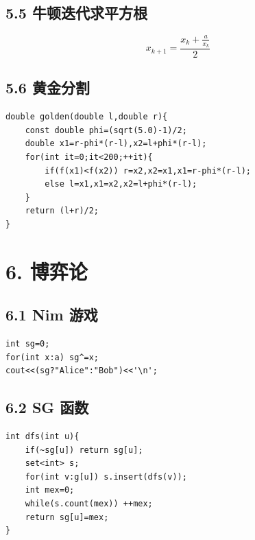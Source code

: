 \documentclass[UTF8,a4paper,11pt]{ctexart}
\begin{document}
\subsection*{5.5 牛顿迭代求平方根}

\[
x_{k+1}=\frac{x_k+\frac{a}{x_k}}{2}
\]

\subsection*{5.6 黄金分割}

\begin{Verbatim}[fontsize=\small,frame=single,breaklines=true,breakanywhere=true]
double golden(double l,double r){
    const double phi=(sqrt(5.0)-1)/2;
    double x1=r-phi*(r-l),x2=l+phi*(r-l);
    for(int it=0;it<200;++it){
        if(f(x1)<f(x2)) r=x2,x2=x1,x1=r-phi*(r-l);
        else l=x1,x1=x2,x2=l+phi*(r-l);
    }
    return (l+r)/2;
}
\end{Verbatim}


\section*{6. 博弈论}

\subsection*{6.1 Nim 游戏}

\begin{Verbatim}[fontsize=\small,frame=single,breaklines=true,breakanywhere=true]
int sg=0;
for(int x:a) sg^=x;
cout<<(sg?"Alice":"Bob")<<'\n';
\end{Verbatim}

\subsection*{6.2 SG 函数}

\begin{Verbatim}[fontsize=\small,frame=single,breaklines=true,breakanywhere=true]
int dfs(int u){
    if(~sg[u]) return sg[u];
    set<int> s;
    for(int v:g[u]) s.insert(dfs(v));
    int mex=0;
    while(s.count(mex)) ++mex;
    return sg[u]=mex;
}
\end{Verbatim}
\end{document}
